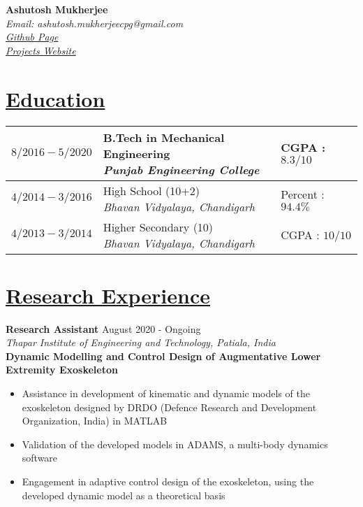 \documentclass{article}
\makeatletter
\renewcommand{\maketitle}{
\begin{center}
\Large{\textbf{Ashutosh Mukherjee}}\\
\large{\textit{Email: ashutosh.mukherjeecpg@gmail.com}}\\
\href{https://github.com/average-engineer}{\large{\textit{Github Page}}}\\
\href{http://portfolioashutoshmukherjee.unaux.com/}{\large{\textit{Projects Website}}}\\
\end{center}}
\def\degree{\large{B.Tech in Mechanical Engineering}}
\def\college{\large{\textit{Punjab Engineering College}}}
\def\school{\large{High School (10+2)}}
\def\sname{\large{\textit{Bhavan Vidyalaya, Chandigarh}}}
\def\tenth{\large{Higher Secondary (10)}}
\def\cgpa{\large{CGPA : $8.3/10$}}
\def\boards{\large{Percent : $94.4\%$}}
\def\tenmarks{\large{CGPA : $10/10$}}
\def\drdodate{\large{August 2020 - Ongoing}}
\makeatother
\begin{document}
\maketitle
\vspace{-1 em}
\hrulefill
\vspace{0.1 in}
\section{\underline{Education}}
\vspace{-1.5 em}
\begin{table}[H]
\centering
\begin{tabular}{|m{1.5in}|m{3in}|m{1.5in}|}
\hline 
\large{$8/2016 - 5/2020$} & \thead{\degree \\[0.1 in] \college}\ & \cgpa \\ 
\hline 
\large{$4/2014 - 3/2016$} & \thead{\school \\[0.1 in] \sname} &  \boards\\ 
\hline
\large{$4/2013 - 3/2014$} & \thead{\tenth \\[0.1 in] \sname} & \tenmarks \\
\hline
\end{tabular}
\end{table}
\vspace{0 in}

\section{\underline{Research Experience}}
\large{\textbf{Research Assistant}}
\hspace{4.1 in}
\drdodate\\
\textit{\large{Thapar Institute of Engineering and Technology, Patiala, India}}\\
\textbf{Dynamic Modelling and Control Design of Augmentative Lower Extremity Exoskeleton}
\begin{itemize}
\item \large{Assistance in development of kinematic and dynamic models of the exoskeleton designed by DRDO (Defence Research and Development Organization, India) in MATLAB}
\item\large{Validation of the developed models in ADAMS, a multi-body dynamics software}
\item\large{Engagement in adaptive control design of the exoskeleton, using the developed dynamic model as a theoretical basis}
\end{itemize}
\end{document}

